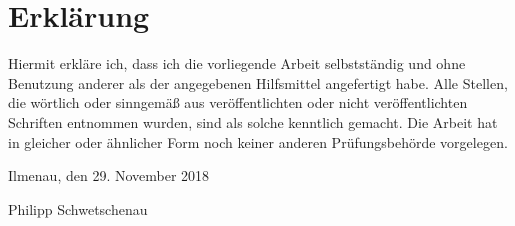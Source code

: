\chapter*{Erklärung}

Hiermit erkläre ich, dass ich die vorliegende Arbeit selbstständig und ohne Benutzung anderer als der angegebenen Hilfsmittel angefertigt habe. Alle Stellen, die wörtlich oder sinngemäß aus veröffentlichten oder nicht veröffentlichten Schriften entnommen wurden, sind als solche kenntlich gemacht. Die Arbeit hat in gleicher oder ähnlicher Form noch keiner anderen Prüfungsbehörde vorgelegen.

\vspace{1.5cm}

\noindent Ilmenau, den 29. November 2018

\vspace{1cm}

\begin{flushright}
\noindent Philipp Schwetschenau
\end{flushright}
